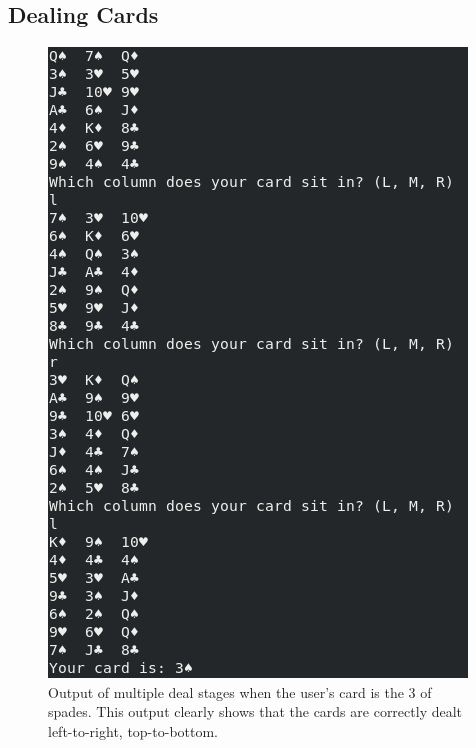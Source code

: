 \documentclass[11]{article}
\begin{document}
			\subsection{Dealing Cards}
				\begin{figure}[h!]
					\caption{Output of multiple deal stages when the user's card is the 3 of spades. This output clearly shows that the cards are correctly dealt left-to-right, top-to-bottom.}				\centering
					\includegraphics[scale=0.5]{Deal.png}
				\end{figure}
	\newpage
\end{document}
